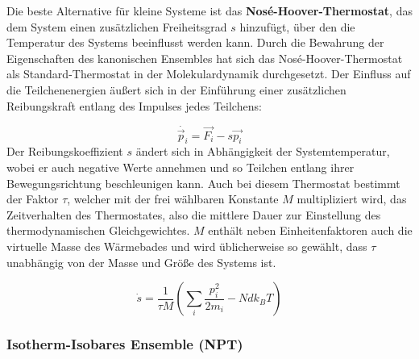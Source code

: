 
Die beste Alternative für kleine Systeme ist das \textbf{Nosé-Hoover-Thermostat}\cite{nose_unified_1984}\cite{hoover_canonical_1985}, das dem System einen zusätzlichen Freiheitsgrad $s$ hinzufügt, über den die Temperatur des Systems beeinflusst werden kann.
Durch die Bewahrung der Eigenschaften des kanonischen Ensembles hat sich das Nosé-Hoover-Thermostat als Standard-Thermostat in der Molekulardynamik durchgesetzt.
Der Einfluss auf die Teilchenenergien äußert sich in der Einführung einer zusätzlichen Reibungskraft entlang des Impulses jedes Teilchens:

\begin{equation}
  \dot{\vec p_i} = \vec{F_i} - s \vec{p_i}
\end{equation}
Der Reibungskoeffizient $s$ ändert sich in Abhängigkeit der Systemtemperatur, wobei er auch negative Werte annehmen und so Teilchen entlang ihrer Bewegungsrichtung beschleunigen kann.
Auch bei diesem Thermostat bestimmt der Faktor $\tau$, welcher mit der frei wählbaren Konstante $M$ multipliziert wird, das Zeitverhalten des Thermostates, also die mittlere Dauer zur Einstellung des thermodynamischen Gleichgewichtes.
$M$ enthält neben Einheitenfaktoren auch die virtuelle Masse des Wärmebades und wird üblicherweise so gewählt, dass $\tau$ unabhängig von der Masse und Größe des Systems ist.

\begin{equation}
  \dot s = \frac{1}{\tau M} \left(\sum_i{\frac{p_i^2}{2m_i}} - N d k_B T\right)
\end{equation}

\subsubsection{Isotherm-Isobares Ensemble (NPT)}


